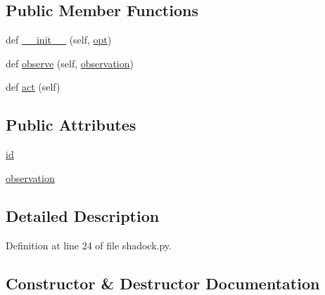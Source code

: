\subsection*{Public Member Functions}
\begin{DoxyCompactItemize}
\item 
def \hyperlink{classshadock_1_1RepeatLabelAgent_aa39519dbddd86ff20666995ea8202ea2}{\+\_\+\+\_\+init\+\_\+\+\_\+} (self, \hyperlink{classparlai_1_1core_1_1agents_1_1Agent_ab3b45d2754244608c75d4068b90cd051}{opt})
\item 
def \hyperlink{classshadock_1_1RepeatLabelAgent_a72e70867bd2e94077d26b52a6040914e}{observe} (self, \hyperlink{classshadock_1_1RepeatLabelAgent_a2455b332a14c998490f888f28322a3bd}{observation})
\item 
def \hyperlink{classshadock_1_1RepeatLabelAgent_aec9b605ede2ba59d9a46aa913bd15649}{act} (self)
\end{DoxyCompactItemize}
\subsection*{Public Attributes}
\begin{DoxyCompactItemize}
\item 
\hyperlink{classshadock_1_1RepeatLabelAgent_af4a393b8da6a36d52f38ea8162efae09}{id}
\item 
\hyperlink{classshadock_1_1RepeatLabelAgent_a2455b332a14c998490f888f28322a3bd}{observation}
\end{DoxyCompactItemize}


\subsection{Detailed Description}


Definition at line 24 of file shadock.\+py.



\subsection{Constructor \& Destructor Documentation}
\mbox{\label{classshadock_1_1RepeatLabelAgent_aa39519dbddd86ff20666995ea8202ea2}} 
